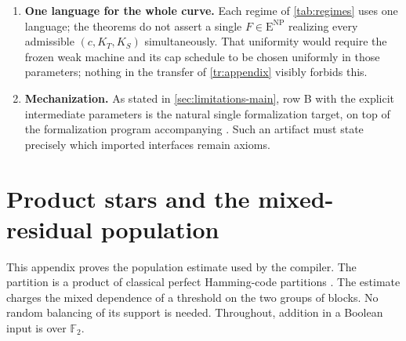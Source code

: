 \documentclass[11pt,letterpaper]{article}
\theoremstyle{definition}
\theoremstyle{remark}
\newcommand{\F}{\mathbb F}
\newcommand{\ENP}{\mathrm{E}^{\mathrm{NP}}}
\begin{document}
\begin{enumerate}
\item \textbf{One language for the whole curve.} Each regime of
\cref{tab:regimes} uses one language; the theorems do not assert a
single $F\in\ENP$ realizing every admissible $(c,K_T,K_S)$
simultaneously. That uniformity would require the frozen weak machine
and its cap schedule to be chosen uniformly in those parameters;
nothing in the transfer of \cref{tr:appendix} visibly forbids this.

\item \textbf{Mechanization.} As stated in
\cref{sec:limitations-main}, row B with the explicit intermediate
parameters is the natural single formalization target, on top of the
formalization program accompanying \cite{NagCubic}. Such an artifact
must state precisely which imported interfaces remain axioms.
\end{enumerate}

\clearpage
\appendix


\section{Product stars and the mixed-residual population}
\label{star:appendix}

This appendix proves the population estimate used by the compiler.
The partition is a product of classical perfect Hamming-code partitions
\cite{Hamming}. The estimate charges the mixed dependence of a threshold
on the two groups of blocks. No random balancing of its support is needed.
Throughout, addition in a Boolean input is over $\F_2$.
\end{document}
